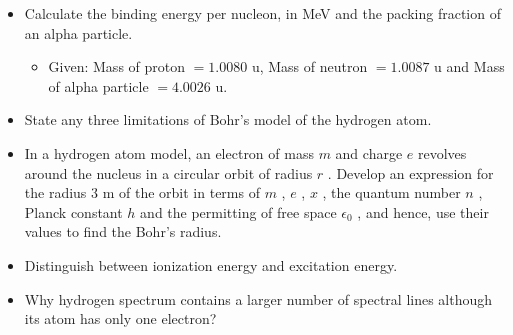 \documentclass{article}
\begin{document}
\begin{itemize}
\item Calculate the binding energy per nucleon, in MeV and the packing fraction of an alpha particle.
 \begin{itemize}
\item Given: Mass of proton $ =1.0080$ u, Mass of neutron $ =1.0087$ u and Mass of alpha particle $ =4.0026$ u.
\end{itemize}
\item State any three limitations of Bohr’s model of the hydrogen atom.
\item In a hydrogen atom model, an electron of mass $ m$ and charge $ e$ revolves around the nucleus in a circular orbit of radius $ r$ . Develop an expression for the radius $ 3$ m of the orbit in terms of $ m$ , $ e$ , $ x$ , the quantum number $ n$ , Planck constant $ h$ and the permitting of free space $ \epsilon _{0}$ , and hence, use their values to find the Bohr’s radius. 
\item Distinguish between ionization energy and excitation energy.
\item Why hydrogen spectrum contains a larger number of spectral lines although its  atom has only one electron? 
\end{itemize}
\end{document}
